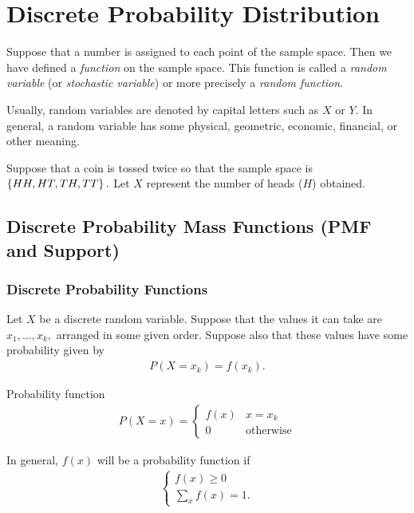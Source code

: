 \section{Discrete Probability Distribution}

Suppose that a number is assigned to each point of the sample space. Then we have defined a \emph{function} on the sample space. This function is called a \emph{random variable} (or \emph{stochastic variable}) or more precisely a \emph{random function}.

Usually, random variables are denoted by capital letters such as $X$ or $Y$. In general, a random variable has some physical, geometric, economic, financial, or other meaning.

\begin{ejemplo}
	\label{exmp:2.6.1}
	Suppose that a coin is tossed twice so that the sample space is $\left\{ HH,HT,TH,TT \right\}.$ Let $X$ represent the number of heads ($H$) obtained.
\end{ejemplo}

\subsection{Discrete Probability Mass Functions (PMF and Support)}
\subsubsection{Discrete Probability Functions}

Let $X$ be a discrete random variable. Suppose that the values it can take are $x_{1},...,x_{k},$ arranged in some given order. Suppose also that these values have some probability given by
\begin{align}
	\label{eq:2.6.1}
	P(X=x_{k})=f(x_{k}).
\end{align}

{Probability function}
\begin{align}
	\label{2.2}
	P(X=x)=
	\begin{cases}
		f(x) & x=x_{k} \\
		0	& \text{otherwise}
	\end{cases}
\end{align}

In general, $f(x)$ will be a probability function if
\begin{align}
	\begin{cases}
		f(x)\geq 0 \\
		\sum_{x}f(x)=1.
	\end{cases}
\end{align}

